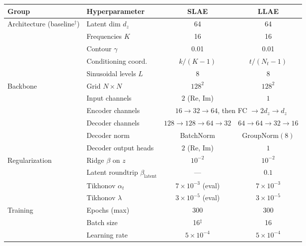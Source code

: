 ﻿\documentclass[a4paper,12pt]{article}
\theoremstyle{definition}
\theoremstyle{remark}
\begin{document}
\begin{table}[H]
    \centering
    \footnotesize
    \setlength{\tabcolsep}{4pt}
    \renewcommand{\arraystretch}{1.2}
    \begin{tabular}{llcc}
        \toprule
        \textbf{Group} & \textbf{Hyperparameter} & \textbf{SLAE} & \textbf{LLAE} \\
        \midrule
        \multirow{5}{*}{Architecture (baseline$^\dagger$)}
          & Latent dim $d_z$                & 64 & 64 \\
          & Frequencies $K$                 & 16 & 16 \\
          & Contour $\gamma$                & 0.01 & 0.01 \\
          & Conditioning coord.\           & $k/(K{-}1)$ & $t/(N_t{-}1)$ \\
          & Sinusoidal levels $L$           & 8 & 8 \\
        \midrule
        \multirow{5}{*}{Backbone}
          & Grid $N \times N$               & $128^2$ & $128^2$ \\
          & Input channels                  & $2$ (Re, Im) & $1$ \\
          & Encoder channels                & \multicolumn{2}{c}{$16 \to 32 \to 64$, then FC $\to 2d_z \to d_z$} \\
          & Decoder channels                & $128\to128\to64\to32$ & $64\to64\to32\to16$ \\
          & Decoder norm                    & BatchNorm & GroupNorm$(8)$ \\
          & Decoder output heads            & $2$ (Re, Im) & $1$ \\
        \midrule
        \multirow{4}{*}{Regularization}
          & Ridge $\beta$ on $z$            & $10^{-2}$ & $10^{-2}$ \\
          & Latent roundtrip $\beta_\text{latent}$ & --- & $0.1$ \\
          & Tikhonov $\alpha_t$             & $7\times10^{-3}$ (eval) & $7\times10^{-3}$ \\
          & Tikhonov $\lambda$              & $3\times10^{-5}$ (eval) & $3\times10^{-5}$ \\
        \midrule
        \multirow{6}{*}{Training}
          & Epochs (max)                    & 300 & 300 \\
          & Batch size                      & 16$^\ddagger$ & 16 \\
          & Learning rate                   & $5\times10^{-4}$ & $5\times10^{-4}$ \\

\end{tabular}
\end{table}
\end{document}
